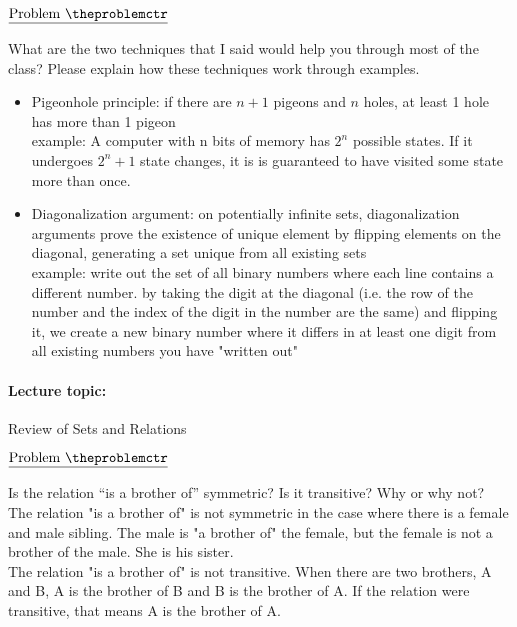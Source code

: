 \documentclass[11pt]{article}
\def\pp{\par\noindent}
\begin{document}
\addtocounter{problemctr}{1}
\bigskip
\noindent
$\underline{\rm Problem\ \theproblemctr}$\pp

\noindent
What are the two techniques that I said would help you through most of the class? Please explain how these techniques work through examples.

\begin{itemize}
    \item Pigeonhole principle: if there are $n+1$ pigeons and $n$ holes, at least 1 hole has more than 1 pigeon\\
    \indent example: A computer with n bits of memory has $2^n$ possible states. If it undergoes $2^n+1$ state changes, it is is guaranteed to have visited some state more than once.
    \item Diagonalization argument: on potentially infinite sets, diagonalization arguments prove the existence of unique element by flipping elements on the diagonal, generating a set unique from all existing sets\\
    \indent example: write out the set of all binary numbers where each line contains a different number. by taking the digit at the diagonal (i.e. the row of the number and the index of the digit in the number are the same) and flipping it, we create a new binary number where it differs in at least one digit from all existing numbers you have "written out"
\end{itemize}


\paragraph{Lecture topic: }  Review of Sets and Relations


\addtocounter{problemctr}{1}
\bigskip
\noindent
$\underline{\rm Problem\ \theproblemctr}$ \pp
Is the relation ``is a brother of'' symmetric? Is it transitive? Why or why not?\\

The relation "is a brother of" is not symmetric in the case where there is a female and male sibling. The male is "a brother of" the female, but the female is not a brother of the male. She is his sister.\\

The relation "is a brother of" is not transitive. When there are two brothers, A and B, A is the brother of B and B is the brother of A. If the relation were transitive, that means A is the brother of A.\\
\end{document}

